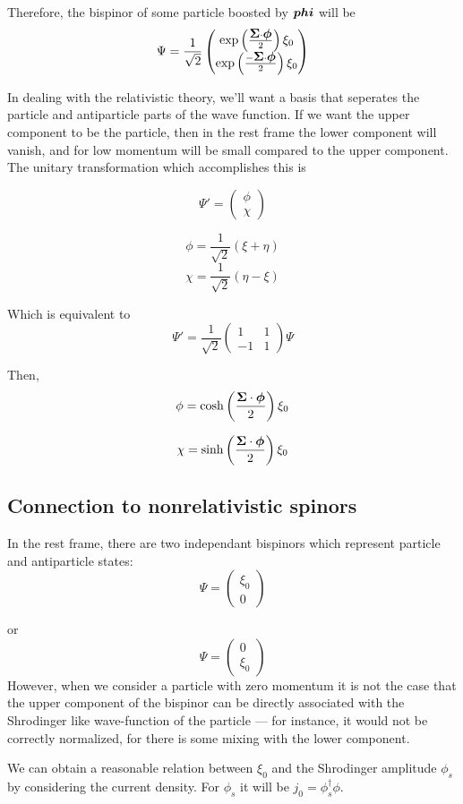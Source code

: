 Therefore, the bispinor of some particle boosted by $\mbox{\boldmath$ phi $}$ will be
\[
\Psi = \frac{1}{\sqrt{2}} \begin{pmatrix} 
		\exp\left( \frac{\mbox{\boldmath$ \Sigma $} \cdot \mbox{\boldmath$ \phi $} }{2} \right)\xi_0 \\ 
		\exp \left( \frac{-\mbox{\boldmath$ \Sigma $} \cdot \mbox{\boldmath$ \phi $} }{2} \right) \xi_0 
	\end{pmatrix}
\]


In dealing with the relativistic theory, we'll want a basis that seperates the particle and antiparticle parts of the wave function.  If we want the upper component to be the particle, then in the rest frame the lower component will vanish, and for low momentum will be small compared to the upper component.  The unitary transformation which accomplishes this is

\[
	\Psi' = \begin{pmatrix} \phi \\ \chi \end{pmatrix}
\]

\[
	\phi = \frac{1}{\sqrt{2}}(\xi + \eta)
\]
\[
	\chi = \frac{1}{\sqrt{2}}( \eta - \xi)
\]

Which is equivalent to
\[
	\Psi' = \frac{1}{\sqrt{2}} \begin{pmatrix}1 & 1 \\ -1 & 1 \end{pmatrix} \Psi
\]

Then,
\[
	\phi =  \cosh \left( \frac{\mbox{\boldmath$ \Sigma $} \cdot \mbox{\boldmath$ \phi $} }{2} \right ) \xi_0
\]

\[
	\chi =  \sinh \left( \frac{\mbox{\boldmath$ \Sigma $} \cdot \mbox{\boldmath$ \phi $} }{2} \right ) \xi_0
\]




\subsection{Connection to nonrelativistic spinors}
In the rest frame, there are two independant bispinors which represent particle and antiparticle states: 
\[
	\Psi = \begin{pmatrix} \xi_0 \\ 0 \end{pmatrix}
\]

or
\[
	\Psi = \begin{pmatrix} 0 \\ \xi_0 \end{pmatrix}
\]
However, when we consider a particle with zero momentum it is not the case that the upper component of the bispinor can be directly associated with the Shrodinger like wave-function of the particle --- for instance, it would not be correctly normalized, for there is some mixing with the lower component.

We can obtain a reasonable relation between $\xi_0$ and the Shrodinger amplitude $\phi_s$ by considering the current density.  For $\phi_s$ it will be $j_0 = \phi_s^\dagger \phi$.








